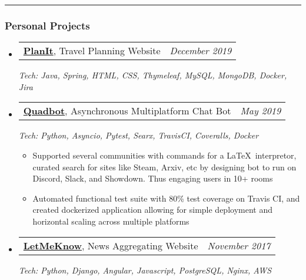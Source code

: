 \documentclass[10pt,letterpaper]{article}
\makeatletter
\newcommand{\headerrow}[2]
{\begin{tabular*}{\linewidth}{l@{\extracolsep{\fill}}r}
		#1 &
		#2 \\
\end{tabular*}}
\makeatother
\begin{document}
	\hrule
	\vspace{-0.4em}
	\subsubsection*{Personal Projects}

	\begin{itemize}[label={}, leftmargin=*]
	\parskip=0.1em
		
		\item 
		\headerrow
		{\textbf{\href{https://wgma.ca/assets/planit-presentation.pdf}{PlanIt}}, Travel Planning Website }
		{\emph{December 2019}}
		{\emph{Tech: Java, Spring, HTML, CSS, Thymeleaf, MySQL, MongoDB, Docker, Jira}}
	
	
		\item
		\headerrow
		{\textbf{\href{https://wgma.ca/quadbot}{Quadbot}}, Asynchronous Multiplatform Chat Bot}
		{\emph{May 2019}}
		{\emph{Tech: Python, Asyncio, Pytest, Searx, TravisCI, Coveralls, Docker}}
		\begin{itemize}
			\setlength\itemsep{0.1em}
			\item  Supported several communities with commands for  a  \LaTeX \  interpretor, curated search for sites like Steam, Arxiv, etc by designing bot to run on Discord, Slack, and Showdown. Thus engaging users in 10+ rooms
			\item Automated functional test suite with 80\% test coverage on Travis CI, and created dockerized application allowing for simple deployment and  horizontal scaling across multiple platforms

		\end{itemize}

		


		\item
		\headerrow
		{\textbf{\href{https://letmeknow.news}{LetMeKnow}}, News Aggregating Website}
		{\emph{November 2017}}
		{\emph{Tech: Python, Django, Angular, Javascript, PostgreSQL, Nginx, AWS}}
		\begin{itemize}
			\setlength\itemsep{0.07em}


\end{itemize}
\end{itemize}
\end{document}

